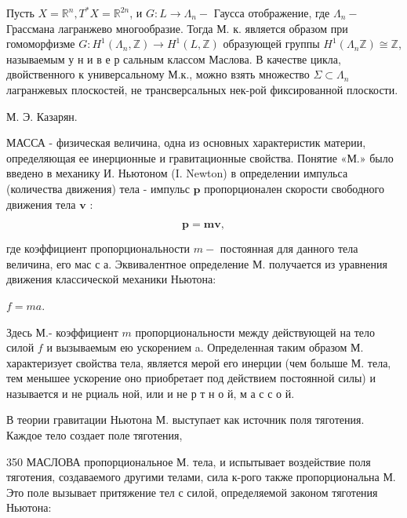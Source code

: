 \documentclass[10pt]{article}
\begin{document}
Пусть $X=\mathbb{R}^{n}, T^{*} X=\mathbb{R}^{2 n}$, и $G: L \rightarrow \Lambda_{n}-$ Гаусса отображение, где $\Lambda_{n}-$ Грассмана лагранжево многообразие. Тогда М. к. является образом при гомоморфизме $G: H^{1}\left(\Lambda_{n}, \mathbb{Z}\right) \rightarrow H^{1}(L, \mathbb{Z})$ образующей группы $H^{1}\left(\Lambda_{n} \mathbb{Z}\right) \cong \mathbb{Z}$, называемым у н и в е р сальным классом Маслова. В качестве цикла, двойственного к универсальному М.к., можно взять множество $\Sigma \subset \Lambda_{n}$ лагранжевых плоскостей, не трансверсальных нек-рой фиксированной плоскости.



М. Э. Казарян.



МАССА - физическая величина, одна из основных характеристик материи, определяющая ее инерционные и гравитационные свойства. Понятие «М.» было введено в механику И. Ньютоном (I. Newton) в определении импульса (количества движения) тела - импульс $\boldsymbol{p}$ пропорционален скорости свободного движения тела $\boldsymbol{v}$ :



\[

\boldsymbol{p}=\boldsymbol{m v},

\]



где коэффициент пропорциональности $m-$ постоянная для данного тела величина, его мас с а. Эквивалентное определение М. получается из уравнения движения классической механики Ньютона:



$f=m a$.



Здесь М.- коэффициент $m$ пропорциональности между действующей на тело силой $f$ и вызываемым ею ускорением a. Определенная таким образом М. характеризует свойства тела, является мерой его инерции (чем болыше М. тела, тем менышее ускорение оно приобретает под действием постоянной силы) и называется и не рциаль ной, или и не р т н о й, м а с с о й.



В теории гравитации Ньютона М. выступает как источник поля тяготения. Каждое тело создает поле тяготения,



350 МАСЛОВА пропорциональное М. тела, и испытывает воздействие поля тяготения, создаваемого другими телами, сила к-рого также пропорциональна М. Это поле вызывает притяжение тел с силой, определяемой законом тяготения Ньютона:
\end{document}
